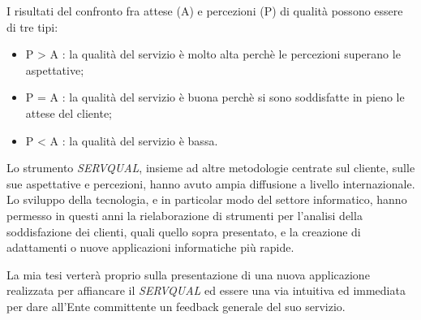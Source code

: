 I risultati del confronto fra attese (A) e percezioni (P) di qualità possono
essere di tre tipi:
\begin{itemize}
  \item P > A : la qualità del servizio è molto alta perchè le percezioni
  superano le aspettative;
  \item P = A : la qualità del servizio è buona perchè si sono soddisfatte in
  pieno le attese del cliente;
  \item P < A : la qualità del servizio è bassa. 
\end{itemize}
Lo strumento \emph{SERVQUAL}, insieme ad altre metodologie centrate sul cliente, sulle
sue aspettative e percezioni, hanno avuto ampia diffusione a livello
internazionale. Lo sviluppo della tecnologia, e in particolar modo del settore
informatico, hanno permesso in questi anni la rielaborazione di strumenti per
l’analisi della soddisfazione dei clienti, quali quello sopra presentato, e la
creazione di adattamenti o nuove applicazioni informatiche più rapide.

La mia tesi verterà proprio sulla presentazione di una nuova applicazione
realizzata per affiancare il \emph{SERVQUAL} ed essere una via intuitiva ed immediata
per dare all’Ente committente un feedback generale del suo servizio.




